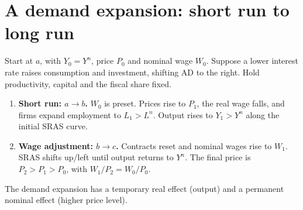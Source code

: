 \documentclass[11pt,letterpaper]{article}
\begin{document}
\newpage
\section{A demand expansion: short run to long run}
Start at $a$, with $Y_0=Y^n$, price $P_0$ and nominal wage $W_0$. Suppose a lower
interest rate raises consumption and investment, shifting AD to the right.
Hold productivity, capital and the fiscal share fixed.

\begin{center}
\end{center}
\vspace{-6pt}
\begin{enumerate}
 \item \textbf{Short run: $a\to b$.} $W_0$ is preset. Prices rise to $P_1$,
 the real wage falls, and firms expand employment to $L_1>L^n$. Output rises
 to $Y_1>Y^n$ along the initial SRAS curve.
 \item \textbf{Wage adjustment: $b\to c$.} Contracts reset and nominal wages
 rise to $W_1$. SRAS shifts up/left until output returns to $Y^n$.
 The final price is $P_2>P_1>P_0$, with $W_1/P_2=W_0/P_0$.
\end{enumerate}
The demand expansion has a temporary real effect (output) and a permanent
nominal effect (higher price level).
\end{document}
